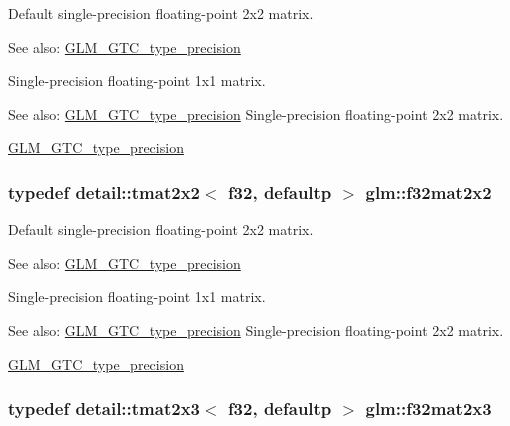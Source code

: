 Default single-precision floating-point 2x2 matrix. \begin{Desc}
\item[See also:]\hyperlink{group__gtc__type__precision}{GLM\_\-GTC\_\-type\_\-precision}\end{Desc}
Single-precision floating-point 1x1 matrix. \begin{Desc}
\item[See also:]\hyperlink{group__gtc__type__precision}{GLM\_\-GTC\_\-type\_\-precision} Single-precision floating-point 2x2 matrix. 

\hyperlink{group__gtc__type__precision}{GLM\_\-GTC\_\-type\_\-precision} \end{Desc}
\hypertarget{group__gtc__type__precision_g4eb16d89ecff72fa77f10c9a1e7ca475}{
\subsubsection[f32mat2x2]{\setlength{\rightskip}{0pt plus 5cm}typedef detail::tmat2x2$<$ f32, defaultp $>$ {\bf glm::f32mat2x2}}}
\label{group__gtc__type__precision_g4eb16d89ecff72fa77f10c9a1e7ca475}


Default single-precision floating-point 2x2 matrix. \begin{Desc}
\item[See also:]\hyperlink{group__gtc__type__precision}{GLM\_\-GTC\_\-type\_\-precision}\end{Desc}
Single-precision floating-point 1x1 matrix. \begin{Desc}
\item[See also:]\hyperlink{group__gtc__type__precision}{GLM\_\-GTC\_\-type\_\-precision} Single-precision floating-point 2x2 matrix. 

\hyperlink{group__gtc__type__precision}{GLM\_\-GTC\_\-type\_\-precision} \end{Desc}
\hypertarget{group__gtc__type__precision_g5ad96c3a7d4c81520d1f30bf5dcdc2b6}{
\subsubsection[f32mat2x3]{\setlength{\rightskip}{0pt plus 5cm}typedef detail::tmat2x3$<$ f32, defaultp $>$ {\bf glm::f32mat2x3}}}
\label{group__gtc__type__precision_g5ad96c3a7d4c81520d1f30bf5dcdc2b6}


